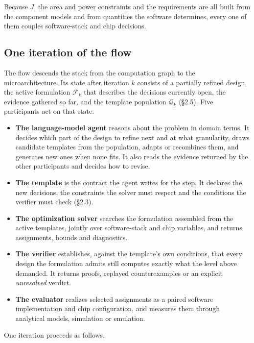\documentclass[11pt]{article}
\providecommand{\tightlist}{\setlength{\itemsep}{0pt}\setlength{\parskip}{0pt}}
\begin{document}
Because \(J\), the area and power constraints and the requirements are all built from the component models and from quantities the software determines, every one of them couples software-stack and chip decisions.

\hypertarget{one-iteration-of-the-flow}{%
\subsection{One iteration of the flow}\label{one-iteration-of-the-flow}}

The flow descends the stack from the computation graph to the microarchitecture. Its state after iteration \(k\) consists of a partially refined design, the active formulation \(\mathcal F_k\) that describes the decisions currently open, the evidence gathered so far, and the template population \(\mathcal Q_k\) (§2.5). Five participants act on that state.

\begin{itemize}
\tightlist
\item
  \textbf{The language-model agent} reasons about the problem in domain terms. It decides which part of the design to refine next and at what granularity, draws candidate templates from the population, adapts or recombines them, and generates new ones when none fits. It also reads the evidence returned by the other participants and decides how to revise.
\item
  \textbf{The template} is the contract the agent writes for the step. It declares the new decisions, the constraints the solver must respect and the conditions the verifier must check (§2.3).
\item
  \textbf{The optimization solver} searches the formulation assembled from the active templates, jointly over software-stack and chip variables, and returns assignments, bounds and diagnostics.
\item
  \textbf{The verifier} establishes, against the template's own conditions, that every design the formulation admits still computes exactly what the level above demanded. It returns proofs, replayed counterexamples or an explicit \emph{unresolved} verdict.
\item
  \textbf{The evaluator} realizes selected assignments as a paired software implementation and chip configuration, and measures them through analytical models, simulation or emulation.
\end{itemize}

One iteration proceeds as follows.
\end{document}
